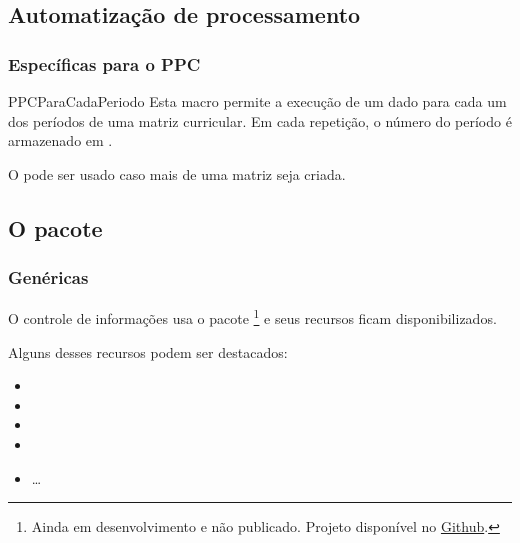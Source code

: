 \documentclass[a4paper, 11pt]{article}
\begin{document}

\subsection{Automatização de processamento}

\subsubsection{Específicas para o PPC}

\begin{Macrodef}{PPCParaCadaPeriodo}{}{}
    Esta macro permite a execução de um dado  para cada um dos períodos de uma matriz curricular. Em cada repetição, o número do período é armazenado em .

    O  pode ser usado caso mais de uma matriz seja criada.
\end{Macrodef}

\subsection{O pacote }

\subsubsection{Genéricas}
O controle de informações usa o pacote \footnote{Ainda em desenvolvimento e não publicado. Projeto disponível no \href{https://github.com/jandermoreira/attrtoolbox}{Github}.} e seus recursos ficam disponibilizados.

Alguns desses recursos podem ser destacados:
\begin{itemize}
    \item {}
    \item {}
    \item {}
    \item {}
    \item \ldots
\end{itemize}
\end{document}
